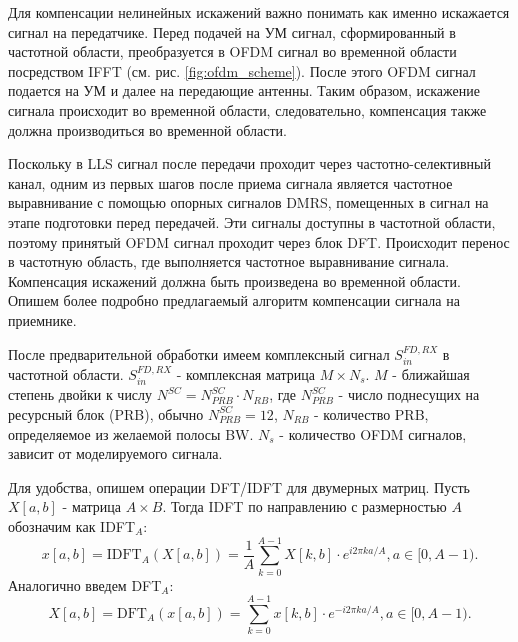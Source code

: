 Для компенсации нелинейных искажений важно понимать как именно искажается
сигнал на передатчике. Перед подачей на УМ сигнал, сформированный в
частотной области, преобразуется в OFDM сигнал во временной области
посредством IFFT (см. рис. \ref{fig:ofdm_scheme}). После этого OFDM сигнал
подается на УМ и далее на передающие антенны. Таким образом, искажение
сигнала происходит во временной области, следовательно, компенсация также
должна производиться во временной области. 

Поскольку в LLS сигнал после передачи проходит через частотно-селективный
канал, одним из первых шагов после приема сигнала является частотное выравнивание с
помощью опорных сигналов DMRS, помещенных в сигнал на этапе
подготовки перед передачей. Эти сигналы доступны в частотной области,
поэтому принятый OFDM сигнал проходит через блок DFT. Происходит перенос в
частотную область, где выполняется частотное выравнивание сигнала.
Компенсация искажений должна быть произведена во временной области.
Опишем более подробно предлагаемый алгоритм компенсации сигнала на
приемнике.

После предварительной обработки имеем комплексный сигнал $S^{FD, RX}_{in}$
в частотной области. $S^{FD, RX}_{in}$ - комплексная матрица $M\times N_s$.
$M$ - ближайшая степень двойки к числу $N^{SC} = N^{SC}_{PRB} \cdot
N_{RB}$, где $N^{SC}_{PRB}$ - число поднесущих на ресурсный блок (PRB),
обычно $N^{SC}_{PRB}=12$, $N_{RB}$ - количество PRB, определяемое из
желаемой полосы BW. $N_s$ - количество OFDM сигналов, зависит от
моделируемого сигнала.

Для удобства, опишем операции DFT/IDFT для двумерных матриц. Пусть $X[a,b]$ -
матрица $A\times B$. Тогда IDFT по направлению с размерностью $A$ обозначим
как IDFT$_A$:
\begin{equation}
    x[a,b] = \text{IDFT}_{A}\left(X[a,b]\right) =\frac{1}{A}\sum^{A-1}_{k=0} X[k,b] \cdot e^{i 2 \pi k a/A}, a \in [0, A-1).
\end{equation}
Аналогично введем DFT$_A$:
\begin{equation}
    X[a,b] = \text{DFT}_{A}\left(x[a,b]\right) =\sum^{A-1}_{k=0} x[k,b] \cdot e^{-i 2 \pi k a/A}, a \in [0, A-1).
\end{equation}

